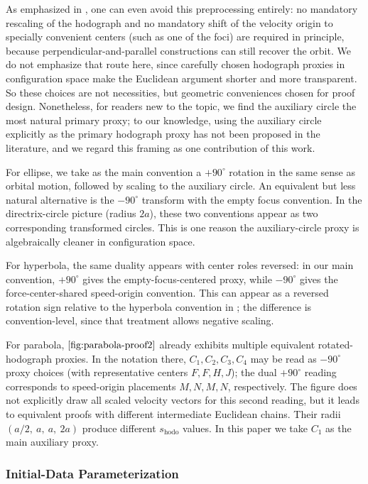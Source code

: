 As emphasized in \cite{gonzalezvillanueva1998circular}, one can even avoid this preprocessing entirely: no mandatory rescaling of the hodograph and no mandatory shift of the velocity origin to specially convenient centers (such as one of the foci) are required in principle, because perpendicular-and-parallel constructions can still recover the orbit. We do not emphasize that route here, since carefully chosen hodograph proxies in configuration space make the Euclidean argument shorter and more transparent. So these choices are not necessities, but geometric conveniences chosen for proof design. Nonetheless, for readers new to the topic, we find the auxiliary circle the most natural primary proxy; to our knowledge, using the auxiliary circle explicitly as the primary hodograph proxy has not been proposed in the literature, and we regard this framing as one contribution of this work.

For ellipse, we take as the main convention a \(+90^\circ\) rotation in the same sense as orbital motion, followed by scaling to the auxiliary circle. An equivalent but less natural alternative is the \(-90^\circ\) transform with the empty focus convention. In the directrix-circle picture (radius \(2a\)), these two conventions appear as two corresponding transformed circles. This is one reason the auxiliary-circle proxy is algebraically cleaner in configuration space.

For hyperbola, the same duality appears with center roles reversed: in our main convention, \(+90^\circ\) gives the empty-focus-centered proxy, while \(-90^\circ\) gives the force-center-shared speed-origin convention. This can appear as a reversed rotation sign relative to the hyperbola convention in \cite{carinena2016newlook}; the difference is convention-level, since that treatment allows negative scaling.

For parabola, \(\Cref{fig:parabola-proof2}\) already exhibits multiple equivalent rotated-hodograph proxies. In the notation there, \(C_1,C_2,C_3,C_4\) may be read as \(-90^\circ\) proxy choices (with representative centers \(F,F,H,J\)); the dual \(+90^\circ\) reading corresponds to speed-origin placements \(M,N,M,N\), respectively. The figure does not explicitly draw all scaled velocity vectors for this second reading, but it leads to equivalent proofs with different intermediate Euclidean chains. Their radii \((a/2,\ a,\ a,\ 2a)\) produce different \(s_{\mathrm{hodo}}\) values. In this paper we take \(C_1\) as the main auxiliary proxy.

\subsubsection{Initial-Data Parameterization}

